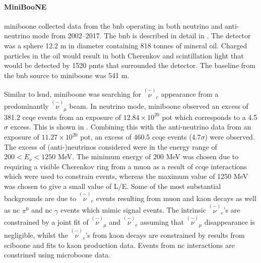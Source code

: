 \paragraph{MiniBooNE}
\gls{miniboone} collected data from the \gls{bnb} operating in both neutrino and anti-neutrino mode from 2002--2017. The \gls{bnb} is described in detail in . The detector was a sphere 12.2 m in diameter containing 818 tonnes of mineral oil. Charged particles in the oil would result in both Cherenkov and scintillation light that would be detected by 1520 \glspl{pmt} that surrounded the detector. The baseline from the \gls{bnb} source to \gls{miniboone} was 541 m.

Similar to \gls{lsnd}, \gls{miniboone} was searching for $\overset{(-)}{\nu}_{\!\!e}$ appearance from a predominantly $\overset{(-)}{\nu}_{\!\!\mu}$ beam. In neutrino mode, \gls{miniboone} observed an excess of 381.2 \gls{ccqe} events from an exposure of $12.84 \times 10^{20}$ \gls{pot} which corresponds to a 4.5$\sigma$ excess. This is shown in . Combining this with the anti-neutrino data from an exposure of $11.27 \times 10^{20}$ \gls{pot}, an excess of 460.5 \gls{ccqe} events (4.7$\sigma$) were observed. The excess of (anti-)neutrinos considered were in the energy range of $200 < E_\nu < 1250$ MeV. The minimum energy of 200 MeV was chosen due to requiring a visible Cherenkov ring from a muon as a result of \numu \gls{ccqe} interactions which were used to constrain \nue events, whereas the maximum value of 1250 MeV was chosen to give a small value of L/E. Some of the most substantial backgrounds are due to $\overset{(-)}{\nu}_{\!\!e}$ events resulting from muon and kaon decays as well as \gls{nc} $\pi^0$ and \gls{nc} $\gamma$ events which mimic signal events. The intrinsic $\overset{(-)}{\nu}_{\!\!e}$'s are constrained by a joint fit of $\overset{(-)}{\nu}_{\!\!\mu}$ and $\overset{(-)}{\nu}_{\!\!e}$ assuming that $\overset{(-)}{\nu}_{\!\!\mu}$ disappearance is negligible, whilst the $\overset{(-)}{\nu}_{\!\!e}$'s from kaon decays are constrained by results from \gls{sciboone} and fits to kaon production data. Events from \gls{nc} interactions are constrined using \gls{microboone} data. 

